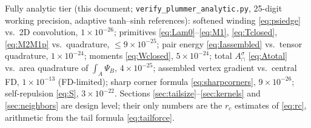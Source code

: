 \documentclass[11pt]{article}
\newcommand{\Acap}{A^{\sigma}_{\cap}}
\begin{document}
Fully analytic tier (this document; \texttt{verify\_plummer\_analytic.py}, 25-digit
working precision, adaptive tanh--sinh references): softened winding
\eqref{eq:psiedge} vs.\ 2D convolution, $1\times10^{-26}$; primitives
\eqref{eq:Lam0}--\eqref{eq:M1}, \eqref{eq:Tclosed}, \eqref{eq:M2M1p} vs.\
quadrature, $\le 9\times10^{-25}$; pair energy \eqref{eq:Iassembled} vs.\ tensor
quadrature, $1\times10^{-24}$; moments \eqref{eq:Wclosed}, $5\times10^{-24}$; total
$\Acap$ \eqref{eq:Atotal} vs.\ area quadrature of $\int_A\Psi_B$,
$4\times10^{-25}$; assembled vertex gradient vs.\ central FD, $1\times10^{-13}$
(FD-limited); sharp corner formula \eqref{eq:sharpcorners}, $9\times10^{-26}$;
self-repulsion \eqref{eq:S}, $3\times10^{-22}$.  Sections
\ref{sec:tailsize}--\ref{sec:kernels} and \ref{sec:neighbors} are design level;
their only numbers are the $r_c$ estimates of \eqref{eq:rc}, arithmetic from the
tail formula \eqref{eq:tailforce}.
\end{document}
